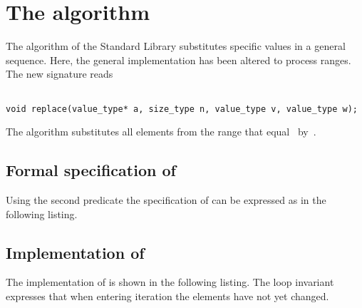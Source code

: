 
\section{The \replace algorithm}

The \replace algorithm of the \cxx Standard Library \cite[\S 28.6.5]{cxx-17-draft} substitutes
specific values in a general sequence.
%
Here, the general implementation
has been altered to process  ranges.
The new signature reads

\begin{lstlisting}[style=acsl-block]

void replace(value_type* a, size_type n, value_type v, value_type w);
\end{lstlisting}

The \replace algorithm substitutes all elements from the range 
that equal~ by~.

\subsection{Formal specification of \replace}

Using the second predicate  the specification of
 can be expressed as in the following listing.



\subsection{Implementation of \replace}

The implementation of  is shown in the following listing.
The loop invariant  expresses
that when entering iteration  the elements 
have not yet changed.



\clearpage

